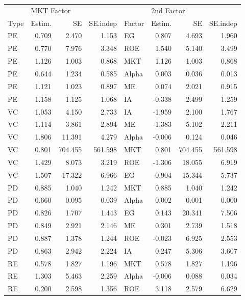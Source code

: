 \documentclass[12pt]{article}
\begin{document}
\begin{table}[ht]
	\centering
	\begin{tabular}{lrrrlrrr}
		 & \multicolumn{3}{l}{MKT Factor} & & \multicolumn{3}{l}{2nd Factor} \\ 
		Type & Estim. & SE & SE.indep & Factor & Estim. & SE & SE.indep \\ 
		\hline
		\hline
PE & 0.709 & 2.470 & 1.153 & EG & 0.807 & 4.693 & 1.960 \\ 
PE & 0.770 & 7.976 & 3.348 & ROE & 1.540 & 5.140 & 3.499 \\ 
PE & 1.126 & 1.003 & 0.868 & MKT & 1.126 & 1.003 & 0.868 \\ 
PE & 0.644 & 1.234 & 0.585 & Alpha & 0.003 & 0.036 & 0.013 \\ 
PE & 1.121 & 1.023 & 0.897 & ME & 0.074 & 2.021 & 0.915 \\ 
PE & 1.158 & 1.125 & 1.068 & IA & -0.338 & 2.499 & 1.259 \\
\hline 
VC & 1.053 & 4.150 & 2.733 & IA & -1.959 & 2.100 & 1.767 \\ 
VC & 1.114 & 3.861 & 2.894 & ME & -1.383 & 5.102 & 2.211 \\ 
VC & 1.806 & 11.391 & 4.279 & Alpha & -0.006 & 0.124 & 0.046 \\ 
VC & 0.801 & 704.455 & 561.598 & MKT & 0.801 & 704.455 & 561.598 \\ 
VC & 1.429 & 8.073 & 3.219 & ROE & -1.306 & 18.055 & 6.919 \\ 
VC & 1.507 & 17.322 & 6.966 & EG & -0.904 & 15.344 & 5.737 \\ 
\hline
PD & 0.885 & 1.040 & 1.242 & MKT & 0.885 & 1.040 & 1.242 \\ 
PD & 0.660 & 0.095 & 0.039 & Alpha & 0.002 & 0.001 & 0.000 \\ 
PD & 0.826 & 1.707 & 1.443 & EG & 0.143 & 20.341 & 7.506 \\ 
PD & 0.849 & 2.921 & 2.146 & ME & 0.301 & 2.739 & 1.518 \\ 
PD & 0.887 & 1.378 & 1.244 & ROE & -0.023 & 6.925 & 2.553 \\ 
PD & 0.863 & 2.942 & 2.224 & IA & 0.247 & 5.306 & 3.607 \\ 
\hline
RE & 0.578 & 1.827 & 1.196 & MKT & 0.578 & 1.827 & 1.196 \\ 
RE & 1.303 & 5.463 & 2.259 & Alpha & -0.006 & 0.088 & 0.034 \\ 
RE & 0.200 & 2.598 & 1.356 & ROE & 3.118 & 2.579 & 6.629 \\ 

\end{tabular}
\end{table}
\end{document}
